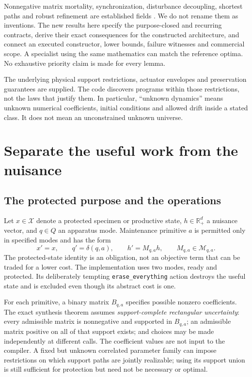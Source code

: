 \documentclass[11pt,letterpaper]{article}
\theoremstyle{definition}\newtheorem{definition}[theorem]{Definition}
\theoremstyle{remark}\newtheorem{remark}[theorem]{Remark}
\newcommand{\R}{\mathbb R}\newcommand{\N}{\mathbb N}\newcommand{\one}{\mathbf1}
\begin{document}
Nonnegative matrix mortality, synchronization, disturbance decoupling, shortest paths and robust refinement are established fields \cite{ryzhikov,kiefer,vorel,willems,reissig}. We do not rename them as inventions. The new results here specify the purpose-closed and recurring contracts, derive their exact consequences for the constructed architecture, and connect an executed constructor, lower bounds, failure witnesses and commercial scope. A specialist using the same mathematics can match the reference optima. No exhaustive priority claim is made for every lemma.

The underlying physical support restrictions, actuator envelopes and preservation guarantees are supplied. The code discovers programs within those restrictions, not the laws that justify them. In particular, ``unknown dynamics'' means unknown numerical coefficients, initial conditions and allowed drift inside a stated class. It does not mean an unconstrained unknown universe.

\section{Separate the useful work from the nuisance}
\label{sec:model}
\subsection{The protected purpose and the operations}
Let $x\in\mathcal X$ denote a protected specimen or productive state, $h\in\R_+^d$ a nuisance vector, and $q\in Q$ an apparatus mode. Maintenance primitive $a$ is permitted only in specified modes and has the form
\begin{equation}
 x'=x,\qquad q'=\delta(q,a),\qquad h'=M_{q,a}h,
 \qquad M_{q,a}\in\mathcal M_{q,a}.
 \label{eq:maintenance}
\end{equation}
The protected-state identity is an obligation, not an objective term that can be traded for a lower cost. The implementation uses two modes, ready and protected. Its deliberately tempting \texttt{erase\_everything} action destroys the useful state and is excluded even though its abstract cost is one.

For each primitive, a binary matrix $B_{q,a}$ specifies possible nonzero coefficients. The exact synthesis theorem assumes \emph{support-complete rectangular uncertainty}: every admissible matrix is nonnegative and supported in $B_{q,a}$; an admissible matrix positive on all of that support exists; and choices may be made independently at different calls. The coefficient values are not input to the compiler. A fixed but unknown correlated parameter family can impose restrictions on which support paths are jointly realizable; using its support union is still sufficient for protection but need not be necessary or optimal.
\end{document}

